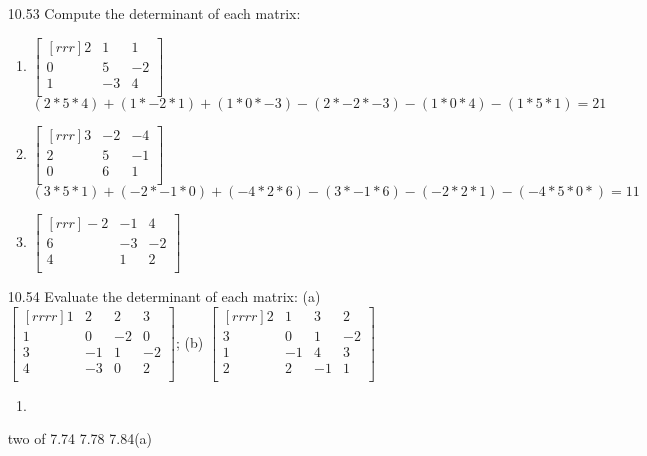 \documentclass[12pt]{article}
\theoremstyle{definition}
\theoremstyle{plain}
\begin{document}
\begin{enumerate}
\item[10.53]Compute the determinant of each matrix:
	\begin{enumerate}
	\item $\begin{bmatrix}[rrr]2&1&1\\0&5&-2\\1&-3&4\\\end{bmatrix}$
	\[ (2*5*4)+(1*-2*1)+(1*0*-3)-(2*-2*-3)-(1*0*4)-(1*5*1) = 21 \]
	\item $\begin{bmatrix}[rrr]3&-2&-4\\2&5&-1\\0&6&1\\\end{bmatrix}$
	\[ (3*5*1)+(-2*-1*0)+(-4*2*6)-(3*-1*6)-(-2*2*1)-(-4*5*0*)=11 \]
	\item $\begin{bmatrix}[rrr]-2&-1&4\\6&-3&-2\\4&1&2\\\end{bmatrix}$
	\end{enumerate}

\item[10.54]Evaluate the determinant of each matrix: (a) $\begin{bmatrix}[rrrr]1&2&2&3\\1&0&-2&0\\3&-1&1&-2\\4&-3&0&2\\\end{bmatrix}$; (b) $\begin{bmatrix}[rrrr]2&1&3&2\\3&0&1&-2\\1&-1&4&3\\2&2&-1&1\\\end{bmatrix}$
	\begin{enumerate}
	\item
	\end{enumerate}

\item[two of 7.74 7.78 7.84(a)]
\end{enumerate}
\end{document}
